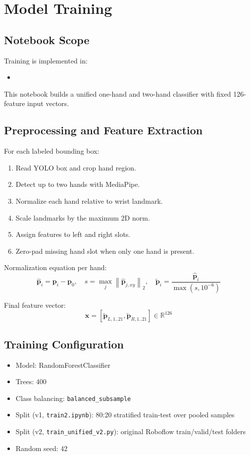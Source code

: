 \chapter{Model Training}

\section{Notebook Scope}
Training is implemented in:
\begin{itemize}[leftmargin=2em]
\item \texttt{}
\end{itemize}

This notebook builds a unified one-hand and two-hand classifier with fixed 126-feature input vectors.

\section{Preprocessing and Feature Extraction}
For each labeled bounding box:
\begin{enumerate}[leftmargin=2em]
\item Read YOLO box and crop hand region.
\item Detect up to two hands with MediaPipe.
\item Normalize each hand relative to wrist landmark.
\item Scale landmarks by the maximum 2D norm.
\item Assign features to left and right slots.
\item Zero-pad missing hand slot when only one hand is present.
\end{enumerate}

Normalization equation per hand:
\[
\hat{\mathbf{p}}_i = \mathbf{p}_i - \mathbf{p}_0,
\quad
s = \max_j \left\|\hat{\mathbf{p}}_{j,xy}\right\|_2,
\quad
\tilde{\mathbf{p}}_i = \frac{\hat{\mathbf{p}}_i}{\max(s,10^{-6})}
\]

Final feature vector:
\[
\mathbf{x} = [\tilde{\mathbf{p}}_{L,1..21},\tilde{\mathbf{p}}_{R,1..21}] \in \mathbb{R}^{126}
\]

\section{Training Configuration}
\begin{itemize}[leftmargin=2em]
\item Model: RandomForestClassifier
\item Trees: 400
\item Class balancing: \texttt{balanced\_subsample}
\item Split (v1, \texttt{train2.ipynb}): 80:20 stratified train-test over pooled samples
\item Split (v2, \texttt{train\_unified\_v2.py}): original Roboflow train/valid/test folders
\item Random seed: 42
\end{itemize}

